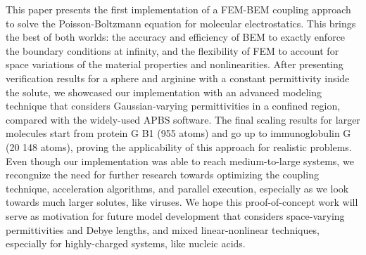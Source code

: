 This paper presents the first implementation of a FEM-BEM coupling approach to solve the Poisson-Boltzmann equation for molecular electrostatics. This brings the best of both worlds: the accuracy and efficiency of BEM to exactly enforce the boundary conditions at infinity, and the flexibility of FEM to account for space variations of the material properties and nonlinearities. After presenting verification results for a sphere and arginine with a constant permittivity inside the solute, we showcased our implementation with an advanced modeling technique that considers Gaussian-varying permittivities in a confined region, compared with the widely-used APBS software. The final scaling results for larger molecules start from protein G B1 (955 atoms) and go up to immunoglobulin G (20 148 atoms), proving the applicability of this approach for realistic problems. Even though our implementation was able to reach medium-to-large systems, we recongnize the need for further research towards optimizing the coupling technique, acceleration algorithms, and parallel execution, especially as we look towards much larger solutes, like viruses. We hope this proof-of-concept work will serve as motivation for future model development that considers space-varying permittivities and Debye lengths, and mixed linear-nonlinear techniques, especially for highly-charged systems, like nucleic acids. 
